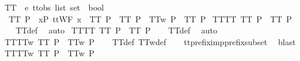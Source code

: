 \isamarkupfalse%
%
\endisatagproof
{\isafoldproof}%
%
\isadelimproof
\isanewline
%
\endisadelimproof
\isanewline
{}\isamarkupfalse%
\ TT\ {\isacharcolon}{\isacharcolon}\ {\isachardoublequoteopen}{\isacharprime}e\ ttobs\ list\ set\ {\isasymRightarrow}\ bool{\isachardoublequoteclose}\ \isanewline
\ \ {\isachardoublequoteopen}TT\ P\ {\isacharequal}\ {\isacharparenleft}{\isacharparenleft}{\isasymforall}x{\isasymin}P{\isachardot}\ ttWF\ x{\isacharparenright}\ {\isasymand}\ TT{}\ P\ {\isasymand}\ TT{}\ P\ {\isasymand}\ TT{}w\ P\ {\isasymand}\ TT{}\ P{\isacharparenright}{\isachardoublequoteclose}\isanewline
\isanewline
{}\isamarkupfalse%
\ TT{\isacharunderscore}TT{}{\isacharcolon}\ {\isachardoublequoteopen}TT\ P\ {\isasymLongrightarrow}\ TT{}\ P{\isachardoublequoteclose}\isanewline
%
\isadelimproof
\ \ %
\endisadelimproof
%
\isatagproof
{}\isamarkupfalse%
\ TT{\isacharunderscore}def\ \isamarkupfalse%
\ auto%
\endisatagproof
{\isafoldproof}%
%
\isadelimproof
\isanewline
%
\endisadelimproof
\isanewline
{}\isamarkupfalse%
\ TT{\isacharunderscore}TT{}{\isacharcolon}\ {\isachardoublequoteopen}TT\ P\ {\isasymLongrightarrow}\ TT{}\ P{\isachardoublequoteclose}\isanewline
%
\isadelimproof
\ \ %
\endisadelimproof
%
\isatagproof
{}\isamarkupfalse%
\ TT{\isacharunderscore}def\ \isamarkupfalse%
\ auto%
\endisatagproof
{\isafoldproof}%
%
\isadelimproof
\isanewline
%
\endisadelimproof
\isanewline
{}\isamarkupfalse%
\ TT{}{\isacharunderscore}TT{}w{\isacharcolon}\ {\isachardoublequoteopen}TT{}\ P\ {\isasymLongrightarrow}\ TT{}w\ P{\isachardoublequoteclose}\isanewline
%
\isadelimproof
\ \ %
\endisadelimproof
%
\isatagproof
{}\isamarkupfalse%
\ TT{}{\isacharunderscore}def\ TT{}w{\isacharunderscore}def\isanewline
\ \ \isamarkupfalse%
\ tt{\isacharunderscore}prefix{\isacharunderscore}imp{\isacharunderscore}prefix{\isacharunderscore}subset\ \isamarkupfalse%
\ blast%
\endisatagproof
{\isafoldproof}%
%
\isadelimproof
\isanewline
%
\endisadelimproof
\isanewline
{}\isamarkupfalse%
\ TT{\isacharunderscore}TT{}w{\isacharcolon}\ {\isachardoublequoteopen}TT\ P\ {\isasymLongrightarrow}\ TT{}w\ P{\isachardoublequoteclose}\isanewline
%
\isadelimproof
\ \ %
\endisadelimproof
%
